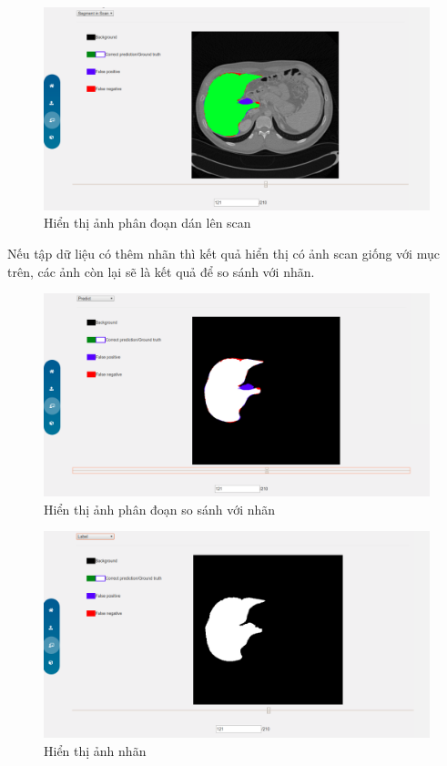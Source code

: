 \begin{figure}[h]
\centering
    \includegraphics[totalheight=7cm]{Images/app_overlap_1.png}
    \caption{Hiển thị ảnh phân đoạn dán lên scan}
    \label{skip_conn}
\end{figure}
Nếu tập dữ liệu có thêm nhãn thì kết quả hiển thị có ảnh scan giống với mục trên, các ảnh còn lại sẽ là kết quả để so sánh với nhãn.
\begin{figure}[h]
\centering
    \includegraphics[totalheight=7cm]{Images/app_showscanompare.png}
    \caption{Hiển thị ảnh phân đoạn so sánh với nhãn}
    \label{skip_conn}
\end{figure}
\begin{figure}[h]
\centering
    \includegraphics[totalheight=7cm]{Images/app_labelreal.png}
    \caption{Hiển thị ảnh nhãn}
    \label{skip_conn}
\end{figure}
